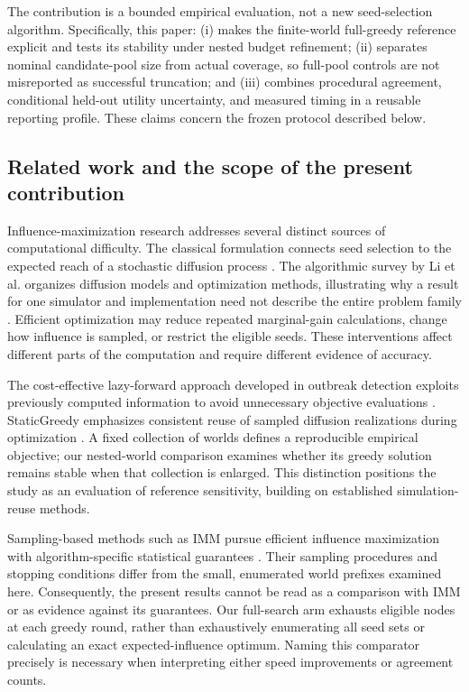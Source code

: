 \documentclass[smallextended]{svjour3}
\begin{document}
The contribution is a bounded empirical evaluation, not a new seed-selection algorithm. Specifically, this paper: (i) makes the finite-world full-greedy reference explicit and tests its stability under nested budget refinement; (ii) separates nominal candidate-pool size from actual coverage, so full-pool controls are not misreported as successful truncation; and (iii) combines procedural agreement, conditional held-out utility uncertainty, and measured timing in a reusable reporting profile. These claims concern the frozen protocol described below.


\subsection{Related work and the scope of the present contribution}

Influence-maximization research addresses several distinct sources of computational difficulty. The classical formulation connects seed selection to the expected reach of a stochastic diffusion process \cite{ref1}. The algorithmic survey by Li et al. organizes diffusion models and optimization methods, illustrating why a result for one simulator and implementation need not describe the entire problem family \cite{ref9}. Efficient optimization may reduce repeated marginal-gain calculations, change how influence is sampled, or restrict the eligible seeds. These interventions affect different parts of the computation and require different evidence of accuracy.

The cost-effective lazy-forward approach developed in outbreak detection exploits previously computed information to avoid unnecessary objective evaluations \cite{ref7}. StaticGreedy emphasizes consistent reuse of sampled diffusion realizations during optimization \cite{ref8}. A fixed collection of worlds defines a reproducible empirical objective; our nested-world comparison examines whether its greedy solution remains stable when that collection is enlarged. This distinction positions the study as an evaluation of reference sensitivity, building on established simulation-reuse methods.

Sampling-based methods such as IMM pursue efficient influence maximization with algorithm-specific statistical guarantees \cite{ref2}. Their sampling procedures and stopping conditions differ from the small, enumerated world prefixes examined here. Consequently, the present results cannot be read as a comparison with IMM or as evidence against its guarantees. Our full-search arm exhausts eligible nodes at each greedy round, rather than exhaustively enumerating all seed sets or calculating an exact expected-influence optimum. Naming this comparator precisely is necessary when interpreting either speed improvements or agreement counts.
\end{document}
